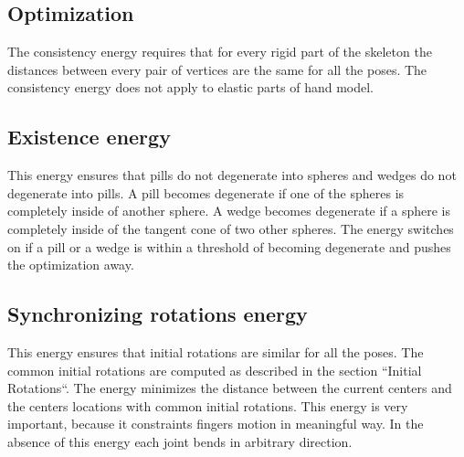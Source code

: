 
\subsection{Optimization}
The consistency energy requires that for every rigid part of the skeleton the distances between every pair of vertices are the same for all the poses. The consistency energy does not apply to elastic parts of hand model.

\subsection{Existence energy}
This energy ensures that pills do not degenerate into spheres and wedges do not degenerate into pills.
A pill becomes degenerate if one of the spheres is completely inside of another sphere. A wedge becomes degenerate if a sphere is completely inside of the tangent cone of two other spheres. The energy switches on if a pill or a wedge is within a threshold of becoming degenerate and pushes the optimization away.

\subsection{Synchronizing rotations energy}
This energy ensures that initial rotations are similar for all the poses. The common initial rotations are computed as described in the section ``Initial Rotations``. The energy minimizes the distance between the current centers and the centers locations with common initial rotations. 
This energy is very important, because it constraints fingers motion in meaningful way. In the absence of this energy each joint bends in arbitrary direction.
